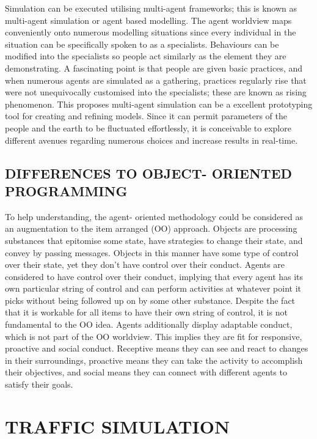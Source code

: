 \documentclass[11pt,a4paper]{article}
\begin{document}
Simulation can be executed utilising multi-agent frameworks; this is known as multi-agent simulation or agent based modelling. The agent worldview maps conveniently onto numerous modelling situations since every individual in the situation can be specifically spoken to as a specialists. Behaviours can be modified into the specialists so people act similarly as the element they are demonstrating. A fascinating point is that people are given basic practices, and when numerous agents are simulated as a gathering, practices regularly rise that were not unequivocally customised into the specialists; these are known as rising phenomenon.\newline 
This proposes multi-agent simulation can be a excellent prototyping tool for creating and refining models. Since it can permit parameters of the people and the earth to be fluctuated effortlessly, it is conceivable to explore different avenues regarding numerous choices and increase results in real-time. 


\subsection{DIFFERENCES TO OBJECT- ORIENTED PROGRAMMING}

To help understanding, the agent- oriented methodology could be considered as an augmentation to the item arranged (OO) approach. Objects are processing substances that epitomise some state, have strategies to change their state, and convey by passing messages. Objects in this manner have some type of control over their state, yet they don't have control over their conduct. Agents are considered to have control over their conduct, implying that every agent has its own particular string of control and can perform activities at whatever point it picks without being followed up on by some other substance. Despite the fact that it is workable for all items to have their own string of control, it is not fundamental to the OO idea.\newline 
Agents additionally display adaptable conduct, which is not part of the OO worldview. This implies they are fit for responsive, proactive and social conduct. Receptive means they can see and react to changes in their surroundings, proactive means they can take the activity to accomplish their objectives, and social means they can connect with different agents to satisfy their goals.
 



\section{TRAFFIC SIMULATION}
 
\end{document}
